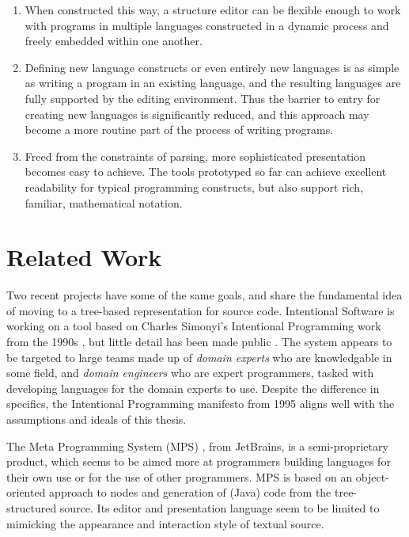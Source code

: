 \begin{enumerate}

\item When constructed this way, a structure editor can be flexible enough to work with programs in multiple languages constructed in a dynamic process and freely embedded within one another.

\item Defining new language constructs or even entirely new languages is as simple as writing a program in an existing language, and the resulting languages are fully supported by the editing environment. Thus the barrier to entry for creating new languages is significantly reduced, and this approach may become a more routine part of the process of writing programs.

\item Freed from the constraints of parsing, more sophisticated presentation becomes easy to achieve. The tools prototyped so far can achieve excellent readability for typical programming constructs, but also support rich, familiar, mathematical notation.

\end{enumerate}

%
%
\section{Related Work}

Two recent projects have some of the same goals, and share the fundamental idea of moving to a tree-based representation for source code. Intentional Software is working on a tool based on Charles Simonyi's Intentional Programming work from the 1990s \cite{simonyi}, but little detail has been made public \cite{intentional}. The system appears to be targeted to large teams made up of \emph{domain experts} who are knowledgable in some field, and \emph{domain engineers} who are expert programmers, tasked with developing languages for the domain experts to use. Despite the difference in specifics, the Intentional Programming manifesto from 1995 aligns well with the assumptions and ideals of this thesis.

The Meta Programming System (MPS) \cite{mps}, from JetBrains, is a semi-proprietary product, which seems to be aimed more at programmers building languages for their own use or for the use of other programmers. MPS is based on an object-oriented approach to nodes and generation of (Java) code from the tree-structured source. Its editor and presentation language seem to be limited to mimicking the appearance and interaction style of textual source.

